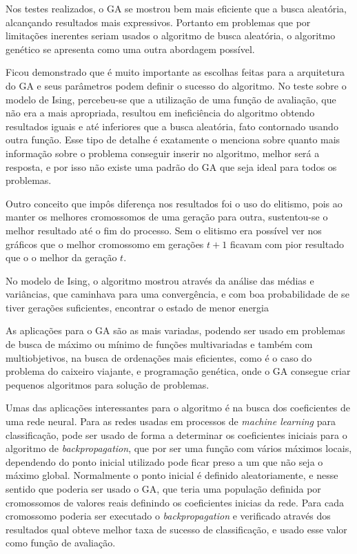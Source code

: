 \documentclass[
	12pt,				%
	openright,			%
	twoside,			%
	a4paper,			%
	english,			%
	brazil				%
	]{abntex2}
\begin{document}
Nos testes realizados, o GA se mostrou bem mais eficiente que a busca aleatória, alcançando resultados mais expressivos. Portanto em problemas que por limitações inerentes seriam usados o algoritmo de busca aleatória, o algoritmo genético se apresenta como uma outra abordagem possível. 

Ficou demonstrado que é muito importante as escolhas feitas para a arquitetura do GA e seus parâmetros podem definir o sucesso do algoritmo. No teste sobre o modelo de Ising, percebeu-se que a utilização de uma função de avaliação, que não era a mais apropriada, resultou em ineficiência do algoritmo obtendo resultados iguais e até inferiores que a busca aleatória, fato contornado usando outra função. Esse tipo de detalhe é exatamente o \citeauthor{Linden2008} menciona sobre quanto mais informação sobre o problema conseguir inserir no algoritmo, melhor será a resposta, e por isso não existe uma padrão do GA que seja ideal para todos os problemas.

Outro conceito que impôs diferença nos resultados foi o uso do elitismo, pois ao manter os melhores cromossomos de uma geração para outra, sustentou-se o melhor resultado até o fim do processo. Sem o elitismo era possível ver nos gráficos que o melhor cromossomo em gerações \(t+1\) ficavam com pior resultado que o o melhor da geração \(t\).

No modelo de Ising, o algoritmo mostrou através da análise das médias e variâncias, que caminhava para uma convergência, e com boa probabilidade de se tiver gerações suficientes, encontrar o estado de menor energia

As aplicações para o GA são as mais variadas, podendo ser usado em problemas de busca de máximo ou mínimo de funções multivariadas e também com multiobjetivos, na busca de ordenações mais eficientes, como é o caso do problema do caixeiro viajante, e programação genética, onde o GA consegue criar pequenos algoritmos para solução de problemas. 

Umas das aplicações interessantes para o algoritmo é na busca dos coeficientes de uma rede neural. Para as redes usadas em processos de \textit{machine learning} para classificação, pode ser usado de forma a determinar os coeficientes iniciais para o algoritmo de \textit{backpropagation}, que por ser uma função com vários máximos locais, dependendo do ponto inicial utilizado pode ficar preso a um que não seja o máximo global. Normalmente o ponto inicial é definido aleatoriamente, e nesse sentido que poderia ser usado o GA, que teria uma população definida por cromossomos de valores reais definindo os coeficientes inicias da rede. Para cada cromossomo poderia ser executado o \textit{backpropagation} e verificado através dos resultados qual obteve melhor taxa de sucesso de classificação, e usado esse valor como função de avaliação.
\end{document}
